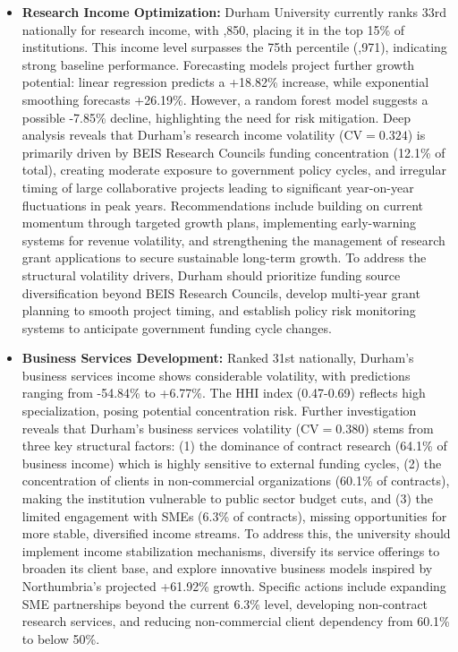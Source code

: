 \documentclass[journal,onecolumn, 10pt,draftclsnofoot]{IEEEtran}
\begin{document}
\begin{itemize}
    \item \textbf{Research Income Optimization:} Durham University currently ranks 33rd nationally for research income, with ,850, placing it in the top 15\% of institutions. This income level surpasses the 75th percentile (,971), indicating strong baseline performance. Forecasting models project further growth potential: linear regression predicts a +18.82\% increase, while exponential smoothing forecasts +26.19\%. However, a random forest model suggests a possible -7.85\% decline, highlighting the need for risk mitigation. Deep analysis reveals that Durham's research income volatility ($\mathrm{CV}=0.324$) is primarily driven by BEIS Research Councils funding concentration (12.1\% of total), creating moderate exposure to government policy cycles, and irregular timing of large collaborative projects leading to significant year-on-year fluctuations in peak years. Recommendations include building on current momentum through targeted growth plans, implementing early-warning systems for revenue volatility, and strengthening the management of research grant applications to secure sustainable long-term growth. To address the structural volatility drivers, Durham should prioritize funding source diversification beyond BEIS Research Councils, develop multi-year grant planning to smooth project timing, and establish policy risk monitoring systems to anticipate government funding cycle changes.
      
    \item \textbf{Business Services Development:} Ranked 31st nationally, Durham's business services income shows considerable volatility, with predictions ranging from -54.84\% to +6.77\%. The HHI index (0.47-0.69) reflects high specialization, posing potential concentration risk. Further investigation reveals that Durham's business services volatility ($\mathrm{CV}=0.380$) stems from three key structural factors: (1) the dominance of contract research (64.1\% of business income) which is highly sensitive to external funding cycles, (2) the concentration of clients in non-commercial organizations (60.1\% of contracts), making the institution vulnerable to public sector budget cuts, and (3) the limited engagement with SMEs (6.3\% of contracts), missing opportunities for more stable, diversified income streams. To address this, the university should implement income stabilization mechanisms, diversify its service offerings to broaden its client base, and explore innovative business models inspired by Northumbria's projected +61.92\% growth. Specific actions include expanding SME partnerships beyond the current 6.3\% level, developing non-contract research services, and reducing non-commercial client dependency from 60.1\% to below 50\%.
    

\end{itemize}
\end{document}
